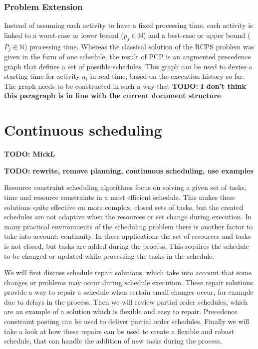 \documentclass{article}
\newcommand{\TODO}[1]{{\color{red}\textbf{TODO: #1}}}
\begin{document}
\subsubsection{Problem Extension}
Instead of assuming each activity to have a fixed processing time, each activity is linked to a worst-case or lower bound ($p_{j} \in \mathbb{N}$) and a best-case or upper bound ($P_{j} \in \mathbb{N}$) processing time.
Whereas the classical solution of the RCPS problem was given in the form of one schedule, the result of PCP is an augmented precedence graph that defines a set of possible schedules.
This graph can be used to devise a starting time for activity $a_i$ in real-time, based on the execution history so far.
The graph needs to be constructed in such a way that 
\TODO{I don't think this paragraph is in line with the current document structure}

\newpage

\section{Continuous scheduling}
\TODO{MickL}

\TODO{rewrite, remove planning, continuous scheduling, use examples}

Resource constraint scheduling algorithms focus on solving a given set of tasks, time and resource constraints in a most efficient schedule.
This makes these solutions quite effective on more complex, closed sets of tasks, but the created schedules are not adaptive when the resources or set change during execution.
In many practical environments of the scheduling problem there is another factor to take into account: continuity.
In these applications the set of resources and tasks is not closed, but tasks are added during the process.
This requires the schedule to be changed or updated while processing the tasks in the schedule.

We will first discuss schedule repair solutions, which take into account that some changes or problems may occur during schedule execution.
These repair solutions provide a way to repair a schedule when certain small changes occur, for example due to delays in the process.
Then we will review partial order schedules, which are an example of a solution which is flexible and easy to repair.
Precedence constraint posting can be used to deliver partial order schedules.
Finally we will take a look at how these repairs can be used to create a flexible and robust schedule, that can handle the addition of new tasks during the process.
\end{document}
